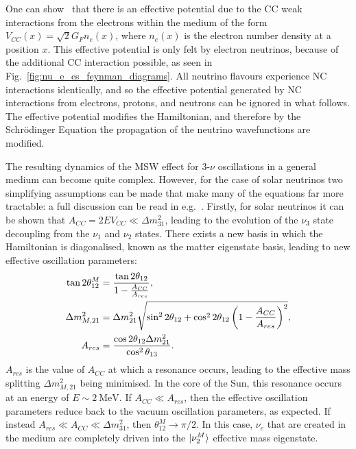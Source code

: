 One can show~\cite{giuntiChapterNeutrinoOscillations2007} that there is an effective potential due to the CC weak interactions from the electrons within the medium of the form $V_{CC}(x) = \sqrt{2}G_{F}n_{e}(x)$, where $n_{e}(x)$ is the electron number density at a position $x$. This effective potential is only felt by electron neutrinos, because of the additional CC interaction possible, as seen in Fig.~\ref{fig:nu_e_es_feynman_diagrams}. All neutrino flavours experience NC interactions identically, and so the effective potential generated by NC interactions from electrons, protons, and neutrons can be ignored in what follows. The effective potential modifies the Hamiltonian, and therefore by the Schr\"{o}dinger Equation the propagation of the neutrino wavefunctions are modified.

The resulting dynamics of the MSW effect for 3-$\nu$ oscillations in a general medium can become quite complex. However, for the case of solar neutrinos two simplifying assumptions can be made that make many of the equations far more tractable: a full discussion can be read in e.g.~\cite{giuntiChapter13Phenomenology2007}. %
Firstly, for solar neutrinos it can be shown that $A_{CC} = 2EV_{CC} \ll \Delta m^{2}_{31}$, leading to the evolution of the $\nu_{3}$ state decoupling from the $\nu_{1}$ and $\nu_{2}$ states. There exists a new basis in which the Hamiltonian is diagonalised, known as the matter eigenstate basis, leading to new effective oscillation parameters: %
\begin{align}\label{eq:matter_osc_params}
    \tan{2\theta_{12}^{M}} &= \frac{\tan{2\theta_{12}}}{1-\frac{A_{CC}}{A_{res}}},\nonumber\\
    \Delta m^{2}_{M,21} &= \Delta m^{2}_{21}{}\sqrt{\sin^{2}2\theta_{12} + \cos^{2}2\theta_{12}\left(1-\frac{A_{CC}}{A_{res}}\right)^{2}},\\
    A_{res} &= \frac{\cos{2\theta_{12}\ensuremath{\Delta m^{2}_{21}}{}}}{\cos^{2}\theta_{13}}.\nonumber
\end{align}
$A_{res}$ is the value of $A_{CC}$ at which a resonance occurs, leading to the effective mass splitting $\Delta m^{2}_{M,21}$ being minimised. In the core of the Sun, this resonance occurs at an energy of $E\sim \SI{2}{\MeV}$. If $A_{CC} \ll A_{res}$, then the effective oscillation parameters reduce back to the vacuum oscillation parameters, as expected. If instead $A_{res} \ll A_{CC} \ll \Delta m^{2}_{31}$, then $\theta_{12}^{M}\to \pi/2$. In this case, $\nu_{e}$ that are created in the medium are completely driven into the $\ket{\nu_{2}^{M}}$ effective mass eigenstate.

